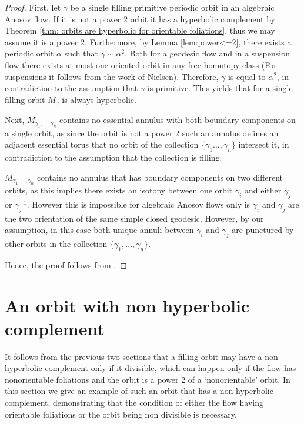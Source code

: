 \documentclass[12pt]{amsart}
\theoremstyle{definition}
\theoremstyle{remark}
\newcommand{\mg}{M_\gamma}
\begin{document}
\begin{proof}
First, let $\gamma$ be a single filling primitive periodic orbit in an algebraic Anosov flow. If it is not a power 2 orbit it has a hyperbolic complement by Theorem \ref{thm: orbits are hyperbolic for orientable foliations}, thus we may assume it is a power 2. Furthermore, by Lemma \ref{lem:power<=2}, there exists a periodic orbit $\alpha$ such that  $\gamma\sim\alpha^2$.
Both for a geodesic flow and in a suspension flow there exists at most one oriented orbit in any free homotopy class (For suspensions it follows from the work of Nielsen). Therefore, $\gamma$ is equal to $\alpha^2$, in contradiction to the assumption that $\gamma$ is primitive. This yields that for a single filling orbit $\mg$ is always hyperbolic.

Next, 
$M_{\gamma_1,\dots,\gamma_n}$ contains no essential annulus with both boundary components on a single orbit, as since the orbit is not a power 2 such an annulus defines an adjacent essential torus that no orbit of the collection $\{\gamma_1\dots,\gamma_n\}$ intersect it, in contradiction to the assumption that the collection is filling. 

$M_{\gamma_1,\dots,\gamma_n}$ contains no annulus that has boundary components on two different orbits, as this implies there exists an isotopy between one orbit $\gamma_i$ and either $\gamma_j$ or $\gamma_j^{-1}$. However this 
is impossible for algebraic Anosov flows only is $\gamma_i$ and $\gamma_j$ are the two orientation of the same simple closed geodesic. However, by our assumption, in this case both unique annuli between $\gamma_i$ and $\gamma_j$ are punctured by other orbits in the collection $\{\gamma_1,\dots,\gamma_n\}$.

Hence, the proof follows from .
\end{proof}




\section{An orbit with non hyperbolic complement}\label{sec:example}

It follows from the previous two sections that a filling orbit may have a non hyperbolic complement only if it divisible, which can happen only if the flow has nonorientable foliations and the orbit is a power 2 of a  `nonorientable' orbit. 
 In this section we give an example of such an orbit that has a non hyperbolic complement, demonstrating that  the condition of either the flow having orientable foliations or the orbit being non divisible is necessary.
\end{document}
